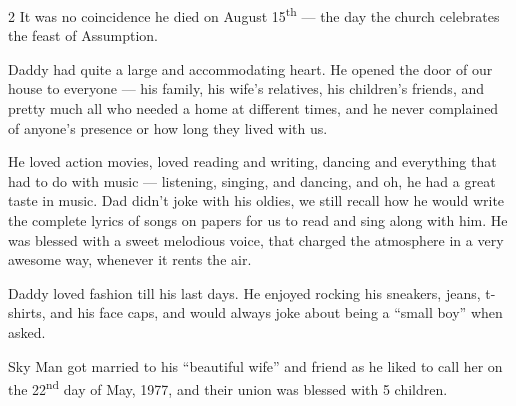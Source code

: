\begin{multicols}{2}
  It was no coincidence he died on August 15\textsuperscript{th} --- the day
  the church celebrates the feast of Assumption.


  Daddy had quite a large and accommodating heart. He opened the door of our
  house to everyone --- his family, his wife's relatives, his children's friends,
  and pretty much all who needed a home at different times, and he never complained of
  anyone's presence or how long they lived with us.

  He loved action movies, loved reading and writing, dancing and everything
  that had to do with music --- listening, singing, and dancing, and oh, he
  had a great taste in music. Dad didn't joke with his oldies, we still recall
  how he would write the complete lyrics of songs on papers for us to read and
  sing along with him. He was blessed with a sweet melodious voice, that
  charged the atmosphere in a very awesome way, whenever it rents the air.

  Daddy loved fashion till his last days. He enjoyed rocking his sneakers,
  jeans, t-shirts, and his face caps, and would always joke about being a
  ``small boy'' when asked.


  Sky Man got married to his ``beautiful wife'' and friend as he liked to call
  her on the 22\textsuperscript{nd} day of May, 1977, and their union was
  blessed with 5 children.

\end{multicols}

%

\newpage

